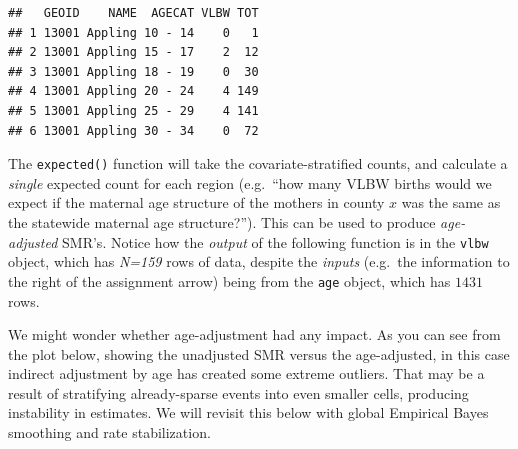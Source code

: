 \documentclass[
]{book}
\newenvironment{Shaded}{\begin{snugshade}}{\end{snugshade}}
\newcommand{\AttributeTok}[1]{\textcolor[rgb]{0.77,0.63,0.00}{#1}}
\newcommand{\CommentTok}[1]{\textcolor[rgb]{0.56,0.35,0.01}{\textit{#1}}}
\newcommand{\DecValTok}[1]{\textcolor[rgb]{0.00,0.00,0.81}{#1}}
\newcommand{\FunctionTok}[1]{\textcolor[rgb]{0.00,0.00,0.00}{#1}}
\newcommand{\NormalTok}[1]{#1}
\newcommand{\OtherTok}[1]{\textcolor[rgb]{0.56,0.35,0.01}{#1}}
\newcommand{\SpecialCharTok}[1]{\textcolor[rgb]{0.00,0.00,0.00}{#1}}
\begin{document}
\begin{verbatim}
##   GEOID    NAME  AGECAT VLBW TOT
## 1 13001 Appling 10 - 14    0   1
## 2 13001 Appling 15 - 17    2  12
## 3 13001 Appling 18 - 19    0  30
## 4 13001 Appling 20 - 24    4 149
## 5 13001 Appling 25 - 29    4 141
## 6 13001 Appling 30 - 34    0  72
\end{verbatim}

The \texttt{expected()} function will take the covariate-stratified counts, and calculate a \emph{single} expected count for each region (e.g.~``how many VLBW births would we expect if the maternal age structure of the mothers in county \(x\) was the same as the statewide maternal age structure?''). This can be used to produce \emph{age-adjusted} SMR's. Notice how the \emph{output} of the following function is in the \texttt{vlbw} object, which has \emph{N=159} rows of data, despite the \emph{inputs} (e.g.~the information to the right of the assignment arrow) being from the \texttt{age} object, which has \(1431\) rows.

\begin{Shaded}
\end{Shaded}

We might wonder whether age-adjustment had any impact. As you can see from the plot below, showing the unadjusted SMR versus the age-adjusted, in this case indirect adjustment by age has created some extreme outliers. That may be a result of stratifying already-sparse events into even smaller cells, producing instability in estimates. We will revisit this below with global Empirical Bayes smoothing and rate stabilization.
\end{document}
